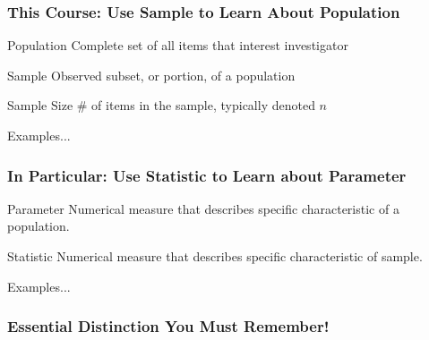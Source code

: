 \documentclass[handout]{beamer}
\begin{document}


\begin{frame}
\frametitle{This Course: Use Sample to Learn About Population}


\begin{block}{Population}
Complete set of all items that interest investigator
\end{block}


\begin{block}{Sample}
Observed subset, or portion, of a population
\end{block}

\begin{block}{Sample Size}
\# of items in the sample, typically denoted $n$
\end{block}


\begin{block}{\hfill Examples...}\end{block}

\end{frame}



\begin{frame}

\frametitle{In Particular: Use Statistic to Learn about Parameter}

\begin{block}{Parameter}
Numerical measure that describes specific characteristic of a population.
\end{block}

\begin{block}{Statistic}
Numerical measure that describes specific characteristic of sample.
\end{block}

\begin{block}{\hfill Examples...}\end{block}

\end{frame}


\begin{frame}
\frametitle{Essential Distinction You Must Remember!}
\begin{figure}
\centering
{}
\end{figure}
\end{frame}
\end{document}
